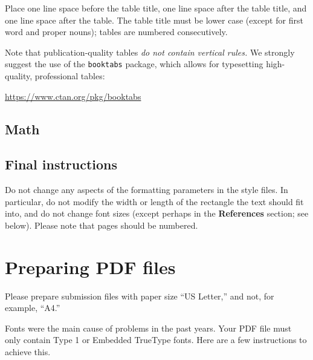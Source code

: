 \documentclass{article}
\begin{document}
Place one line space before the table title, one line space after the
table title, and one line space after the table. The table title must
be lower case (except for first word and proper nouns); tables are
numbered consecutively.


Note that publication-quality tables \emph{do not contain vertical rules.} We
strongly suggest the use of the \verb+booktabs+ package, which allows for
typesetting high-quality, professional tables:
\begin{center}
  \url{https://www.ctan.org/pkg/booktabs}
\end{center}



\subsection{Math}

\subsection{Final instructions}

Do not change any aspects of the formatting parameters in the style files.  In
particular, do not modify the width or length of the rectangle the text should
fit into, and do not change font sizes (except perhaps in the
\textbf{References} section; see below). Please note that pages should be
numbered.


\section{Preparing PDF files}


Please prepare submission files with paper size ``US Letter,'' and not, for
example, ``A4.''


Fonts were the main cause of problems in the past years. Your PDF file must only
contain Type 1 or Embedded TrueType fonts. Here are a few instructions to
achieve this.
\end{document}
